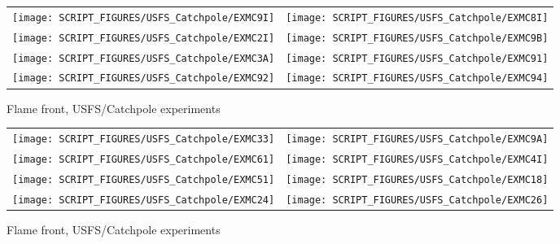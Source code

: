\begin{figure}[p]
\begin{tabular*}{\textwidth}{l@{\extracolsep{\fill}}r}
\texttt{[image: SCRIPT\_FIGURES/USFS\_Catchpole/EXMC9I]} &
\texttt{[image: SCRIPT\_FIGURES/USFS\_Catchpole/EXMC8I]} \\
\texttt{[image: SCRIPT\_FIGURES/USFS\_Catchpole/EXMC2I]} &
\texttt{[image: SCRIPT\_FIGURES/USFS\_Catchpole/EXMC9B]} \\
\texttt{[image: SCRIPT\_FIGURES/USFS\_Catchpole/EXMC3A]} &
\texttt{[image: SCRIPT\_FIGURES/USFS\_Catchpole/EXMC91]} \\
\texttt{[image: SCRIPT\_FIGURES/USFS\_Catchpole/EXMC92]} &
\texttt{[image: SCRIPT\_FIGURES/USFS\_Catchpole/EXMC94]} \\
\end{tabular*}
\caption[Flame front, USFS/Catchpole experiments]{Flame front, USFS/Catchpole experiments}
\label{USFS_Catchpole_264}
\end{figure}

\begin{figure}[p]
\begin{tabular*}{\textwidth}{l@{\extracolsep{\fill}}r}
\texttt{[image: SCRIPT\_FIGURES/USFS\_Catchpole/EXMC33]} &
\texttt{[image: SCRIPT\_FIGURES/USFS\_Catchpole/EXMC9A]} \\
\texttt{[image: SCRIPT\_FIGURES/USFS\_Catchpole/EXMC61]} &
\texttt{[image: SCRIPT\_FIGURES/USFS\_Catchpole/EXMC4I]} \\
\texttt{[image: SCRIPT\_FIGURES/USFS\_Catchpole/EXMC51]} &
\texttt{[image: SCRIPT\_FIGURES/USFS\_Catchpole/EXMC18]} \\
\texttt{[image: SCRIPT\_FIGURES/USFS\_Catchpole/EXMC24]} &
\texttt{[image: SCRIPT\_FIGURES/USFS\_Catchpole/EXMC26]} \\
\end{tabular*}
\caption[Flame front, USFS/Catchpole experiments]{Flame front, USFS/Catchpole experiments}
\label{USFS_Catchpole_272}
\end{figure}

